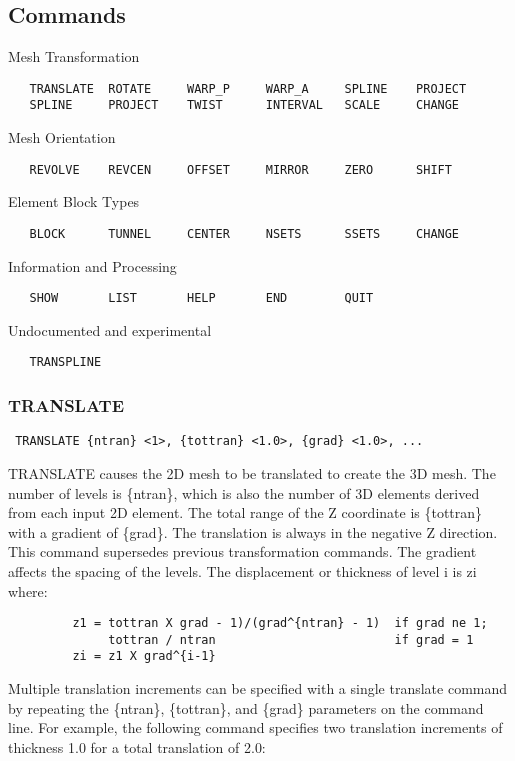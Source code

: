 \subsection{Commands}
Mesh Transformation
\begin{verbatim}
   TRANSLATE  ROTATE     WARP_P     WARP_A     SPLINE    PROJECT
   SPLINE     PROJECT    TWIST      INTERVAL   SCALE     CHANGE    
\end{verbatim}

Mesh Orientation
\begin{verbatim}
   REVOLVE    REVCEN     OFFSET     MIRROR     ZERO      SHIFT
\end{verbatim}

Element Block Types
\begin{verbatim}
   BLOCK      TUNNEL     CENTER     NSETS      SSETS     CHANGE
\end{verbatim}

Information and Processing
\begin{verbatim}
   SHOW       LIST       HELP       END        QUIT      
\end{verbatim}

Undocumented and experimental
\begin{verbatim}
   TRANSPLINE
\end{verbatim}
\subsubsection{TRANSLATE}
\begin{verbatim}
 TRANSLATE {ntran} <1>, {tottran} <1.0>, {grad} <1.0>, ...
\end{verbatim}

TRANSLATE causes the 2D mesh to be translated to create the 3D mesh.
The number of levels is \{ntran\}, which is also the number of 3D elements
derived from each input 2D element.  The total range of the Z coordinate
is \{tottran\} with a gradient of \{grad\}.  The translation is always in
the negative Z direction.  This command supersedes previous
transformation commands.
The gradient affects the spacing of the levels.  The displacement or
thickness of level i is zi where:  
\begin{verbatim}
         z1 = tottran X grad - 1)/(grad^{ntran} - 1)  if grad ne 1;
              tottran / ntran                         if grad = 1
         zi = z1 X grad^{i-1}
\end{verbatim}
Multiple translation increments can be specified with a single translate
command by repeating the \{ntran\}, \{tottran\}, and \{grad\} parameters on
the command line.  For example, the following command specifies two
translation increments of thickness 1.0 for a total translation of 2.0: 

